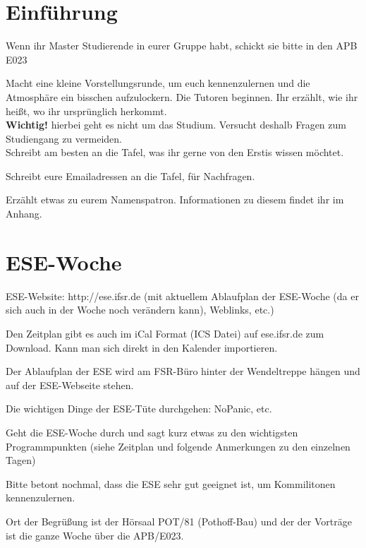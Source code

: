 \documentclass[a4paper,12pt]{report}
\begin{document}
\section{Einführung}
\begin{itemize*}
\item Wenn ihr Master Studierende in eurer Gruppe habt, schickt sie bitte in den APB E023
\item Macht eine kleine Vorstellungsrunde, um euch kennenzulernen und die Atmosphäre ein bisschen aufzulockern.
Die Tutoren beginnen. Ihr erzählt, wie ihr heißt, wo ihr ursprünglich herkommt.\\
\textbf{Wichtig!} hierbei geht es nicht um das Studium. Versucht deshalb Fragen zum Studiengang zu vermeiden.\\
Schreibt am besten an die Tafel, was ihr gerne von den Erstis wissen möchtet.
\item Schreibt eure Emailadressen an die Tafel, für Nachfragen.
\item Erzählt etwas zu eurem Namenspatron. Informationen zu diesem findet ihr im Anhang.
\end{itemize*}

\section{ESE-Woche}
\begin{itemize*}
\item ESE-Website: http://ese.ifsr.de (mit aktuellem Ablaufplan der ESE-Woche (da er sich auch in der Woche noch verändern kann), Weblinks, etc.)
\item Den Zeitplan gibt es auch im iCal Format (ICS Datei) auf ese.ifsr.de zum Download.
Kann man sich direkt in den Kalender importieren.
\item Der Ablaufplan der ESE wird am FSR-Büro hinter der Wendeltreppe hängen und auf der ESE-Webseite stehen.
\item Die wichtigen Dinge der ESE-Tüte durchgehen: NoPanic, etc.
\item Geht die ESE-Woche durch und sagt kurz etwas zu den wichtigsten Programmpunkten (siehe Zeitplan und folgende Anmerkungen zu den einzelnen Tagen)
\item Bitte betont nochmal, dass die ESE sehr gut geeignet ist, um Kommilitonen kennenzulernen.
\end{itemize*}
\vspace{0.5cm}
Ort der Begrüßung ist der Hörsaal POT/81 (Pothoff-Bau) und der der Vorträge ist die ganze Woche über die APB/E023.
\end{document}
